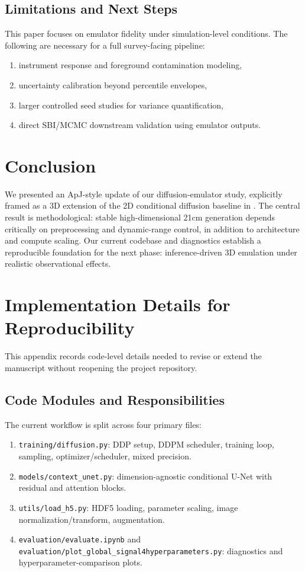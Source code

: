 \documentclass{aastex631}
\begin{document}
\subsection{Limitations and Next Steps}
This paper focuses on emulator fidelity under simulation-level conditions. The following are necessary for a full survey-facing pipeline:
\begin{enumerate}
    \item instrument response and foreground contamination modeling,
    \item uncertainty calibration beyond percentile envelopes,
    \item larger controlled seed studies for variance quantification,
    \item direct SBI/MCMC downstream validation using emulator outputs.
\end{enumerate}

\section{Conclusion}
We presented an ApJ-style update of our diffusion-emulator study, explicitly framed as a 3D extension of the 2D conditional diffusion baseline in \citet{zhao2023can}. The central result is methodological: stable high-dimensional 21cm generation depends critically on preprocessing and dynamic-range control, in addition to architecture and compute scaling. Our current codebase and diagnostics establish a reproducible foundation for the next phase: inference-driven 3D emulation under realistic observational effects.

\appendix
\section{Implementation Details for Reproducibility}
This appendix records code-level details needed to revise or extend the manuscript without reopening the project repository.

\subsection{Code Modules and Responsibilities}
The current workflow is split across four primary files:
\begin{enumerate}
    \item \texttt{training/diffusion.py}: DDP setup, DDPM scheduler, training loop, sampling, optimizer/scheduler, mixed precision.
    \item \texttt{models/context\_unet.py}: dimension-agnostic conditional U-Net with residual and attention blocks.
    \item \texttt{utils/load\_h5.py}: HDF5 loading, parameter scaling, image normalization/transform, augmentation.
    \item \texttt{evaluation/evaluate.ipynb} and \texttt{evaluation/plot\_global\_signal4hyperparameters.py}: diagnostics and hyperparameter-comparison plots.
\end{enumerate}
\end{document}

